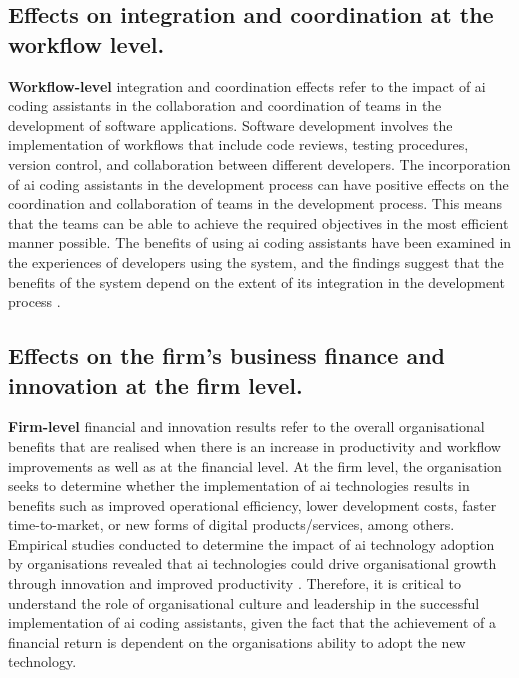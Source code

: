 \subsection {Effects on integration and coordination at the workflow level.}
\label{sec:Effects on integration and coordination at the workflow level}
\textbf{Workflow-level} integration and coordination effects refer to the impact of \gls{ai} coding assistants in the collaboration and coordination of teams in the development of software applications. Software development involves the implementation of workflows that include code reviews, testing procedures, version control, and collaboration between different developers. The incorporation of \gls{ai} coding assistants in the development process can have positive effects on the coordination and collaboration of teams in the development process. This means that the teams can be able to achieve the required objectives in the most efficient manner possible. The benefits of using \gls{ai} coding assistants have been examined in the experiences of developers using the system, and the findings suggest that the benefits of the system depend on the extent of its integration in the development process \autocite{Sergeyuk2025}.

\subsection {Effects on the firm's business finance and innovation at the firm level.}
\label{sec:Effects on the firm's business finance and innovation at the firm level}
\textbf{Firm-level} financial and innovation results refer to the overall organisational benefits that are realised when there is an increase in productivity and workflow improvements as well as at the financial level. At the firm level, the organisation seeks to determine whether the implementation of \gls{ai} technologies results in benefits such as improved operational efficiency, lower development costs, faster time-to-market, or new forms of digital products/services, among others. Empirical studies conducted to determine the impact of \gls{ai} technology adoption by organisations revealed that \gls{ai} technologies could drive organisational growth through innovation and improved productivity \autocite{Babina2024}. Therefore, it is critical to understand the role of organisational culture and leadership in the successful implementation of \gls{ai} coding assistants, given the fact that the achievement of a financial return is dependent on the organisations ability to adopt the new technology.

